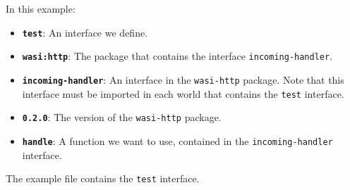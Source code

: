 In this example:
\begin{itemize}
\item \textbf{\texttt{test}}: An interface we define.
\item \textbf{\texttt{wasi:http}}: The package that contains the interface \texttt{incoming-handler}.
\item \textbf{\texttt{incoming-handler}}: An interface in the \texttt{wasi-http} package. Note that this interface must be imported in each world that contains the \texttt{test} interface.
\item \textbf{\texttt{0.2.0}}: The version of the \texttt{wasi-http} package.
\item \textbf{\texttt{handle}}: A function we want to use, contained in the \texttt{incoming-handler} interface.
\end{itemize}

The example file contains the \texttt{test} interface.

